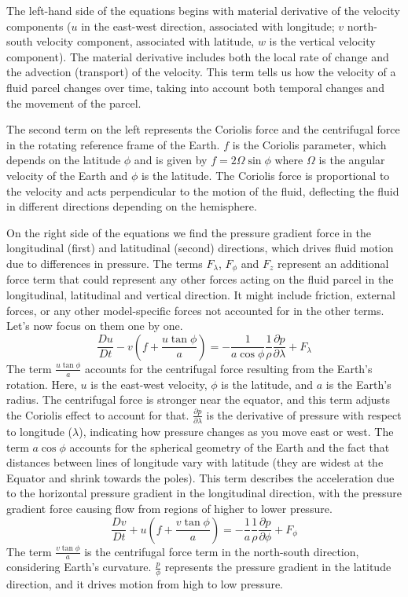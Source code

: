 The left-hand side of the equations begins with material derivative of the velocity components ($u$ in the east-west direction, associated with longitude; $v$ north-south velocity component, associated with latitude, $w$ is the vertical velocity component).
The material derivative includes both the local rate of change and the advection (transport) of the velocity. This term tells us how the velocity of a fluid parcel changes over time, taking into account both temporal changes and the movement of the parcel.

The second term on the left represents the Coriolis force and the centrifugal force in the rotating reference frame of the Earth. $f$ is the Coriolis parameter, which depends on the latitude $\phi$ and is given by $f=2\Omega\sin\phi$ where $\Omega$ is the angular velocity of the Earth and $\phi$ is the latitude. The Coriolis force is proportional to the velocity and acts perpendicular to the motion of the fluid, deflecting the fluid in different directions depending on the hemisphere.

On the right side of the equations we find the pressure gradient force in the longitudinal (first) and latitudinal (second) directions, which drives fluid motion due to differences in pressure. The terms $F_{\lambda}$, $F_{\phi}$ and $F_{z}$ represent an additional force term that could represent any other forces acting on the fluid parcel in the longitudinal, latitudinal and vertical direction. It might include friction, external forces, or any other model-specific forces not accounted for in the other terms.\\

Let's now focus on them one by one.
\begin{equation}
	\frac{Du}{Dt}-v\left(f+\frac{u\tan\phi}{a}\right)=-\frac{1}{a\cos\phi}\frac{1}{\rho}\frac{\partial p}{\partial\lambda}+F_{\lambda}
\end{equation}
The term $\frac{u\tan\phi}{a}$ accounts for the centrifugal force resulting from the Earth's rotation. Here, $u$ is the east-west velocity, $\phi$ is the latitude, and $a$ is the Earth's radius. The centrifugal force is stronger near the equator, and this term adjusts the Coriolis effect to account for that.
$\frac{\partial p}{\partial\lambda}$ is the derivative of pressure with respect to longitude ($\lambda$), indicating how pressure changes as you move east or west. The term $a\cos\phi$ accounts for the spherical geometry of the Earth and the fact that distances between lines of longitude vary with latitude (they are widest at the Equator and shrink towards the poles). This term describes the acceleration due to the horizontal pressure gradient in the longitudinal direction, with the pressure gradient force causing flow from regions of higher to lower pressure.
\begin{equation}
	\frac{Dv}{Dt}+u\left(f+\frac{v\tan\phi}{a}\right)=-\frac{1}{a}\frac{1}{\rho}\frac{\partial p}{\partial\phi}+F_{\phi}
\end{equation}
The term $\frac{v\tan\phi}{a}$ is the centrifugal force term in the north-south direction, considering Earth's curvature. $\frac{p}{\phi}$ represents the pressure gradient in the latitude direction, and it drives motion from high to low pressure.


